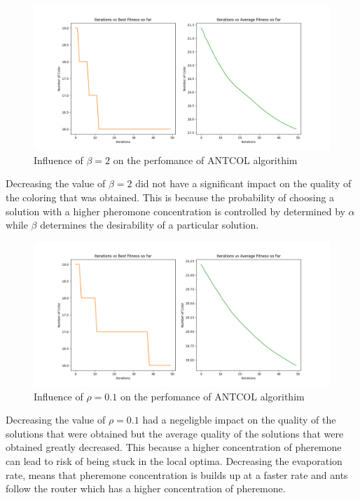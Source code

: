 \documentclass[a4paper]{article}
\begin{document}
\begin{center}
    \begin{figure}[h]
    \centering
    \includegraphics[width=12cm]{Figures/fig8.png}
    \caption{Influence of $\beta = 2$ on the perfomance of ANTCOL algorithim}
    \end{figure}
\end{center}
Decreasing the value of $\beta = 2$ did not have a significant impact on the quality of the coloring that was obtained. This is because the probability of choosing a solution with a higher pheromone concentration is controlled by 
determined by $\alpha$ while $\beta$ determines the desirability of a particular solution. 
\begin{center}
    \begin{figure}[h]
    \centering
    \includegraphics[width=12cm]{Figures/fig9.png}
    \caption{Influence of $\rho = 0.1$ on the perfomance of ANTCOL algorithim}
    \end{figure}
\end{center}

Decreasing the value of $\rho = 0.1$ had a negeligble impact on the quality of the solutions that were obtained but the average quality of the solutions that were obtained greatly decreased. This because a higher concentration of pheremone can lead to risk of being stuck in the local optima.
Decreasing the evaporation rate, means that pheremone concentration is builds up at a faster rate and ants follow the router which has a higher concentration of pheremone. 
\end{document}
